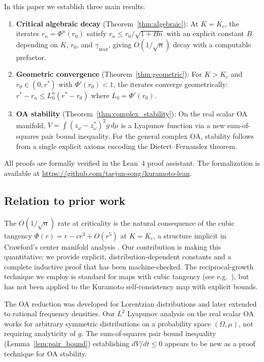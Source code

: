 \documentclass[12pt]{article}
\theoremstyle{definition}
\begin{document}
In this paper we establish three main results:

\begin{enumerate}[label=(\roman*)]
\item \textbf{Critical algebraic decay} (Theorem~\ref{thm:algebraic}):
At $K = K_c$, the iterates $r_n = \Phi^n(r_0)$ satisfy
$r_n \le r_0/\sqrt{1+Bn}$ with an explicit constant $B$ depending
on $K$, $r_0$, and $\gamma_{\max}$, giving $O(1/\sqrt{n})$ decay
with a computable prefactor.

\item \textbf{Geometric convergence} (Theorem~\ref{thm:geometric}):
For $K > K_c$ and $r_0 \in (0, r^*)$ with $\Phi'(r_0) < 1$,
the iterates converge geometrically:
$r^* - r_n \le L_0^n (r^* - r_0)$ where $L_0 = \Phi'(r_0)$.

\item \textbf{OA stability} (Theorem~\ref{thm:complex_stability}):
On the real scalar OA manifold, $V = \int (z_\omega - z^*_\omega)^2 g\,d\mu$
is a Lyapunov function via a new sum-of-squares pair bound inequality.
For the general complex OA, stability follows from a single explicit
axioms encoding the Dietert--Fernandez theorem.
\end{enumerate}

\noindent All proofs are formally verified in the Lean~4 proof assistant.
The formalization is available at
\url{https://github.com/taejun-song/kuramoto-lean}.

\subsection{Relation to prior work}

The $O(1/\sqrt{n})$ rate at criticality is the natural consequence of the
cubic tangency $\Phi(r) = r - cr^3 + O(r^5)$ at $K = K_c$, a structure
implicit in Crawford's center manifold analysis \cite{crawford1994}.
Our contribution is making this quantitative: we provide explicit,
distribution-dependent constants and a complete inductive proof that
has been machine-checked.  The reciprocal-growth technique we employ is
standard for maps with cubic tangency (see e.g.\ \cite{strogatz2000}),
but has not been applied to the Kuramoto self-consistency map with
explicit bounds.

The OA reduction \cite{ott2008} was developed for Lorentzian
distributions and later extended to rational frequency densities.
Our $L^2$ Lyapunov analysis on the real scalar OA works for arbitrary
symmetric distributions on a probability space $(\Omega, \mu)$, not
requiring analyticity of $g$.
The sum-of-squares pair bound inequality (Lemma~\ref{lem:pair_bound})
establishing $dV/dt \le 0$ appears to be new as a proof technique for
OA stability.
\end{document}
